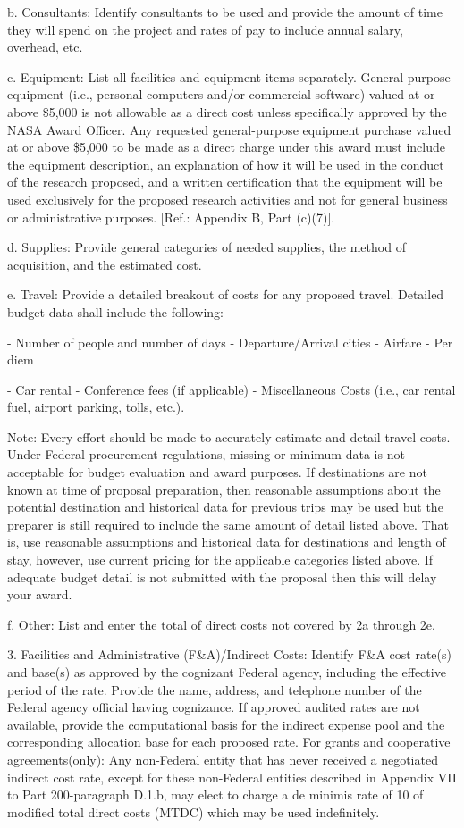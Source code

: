 \documentclass[12pt]{article}
\begin{document}
b. Consultants: Identify consultants to be used and provide the amount
of time they will spend on the project and rates of pay to include
annual salary, overhead, etc.

c. Equipment: List all facilities and equipment items
separately. General-purpose equipment (i.e., personal computers and/or
commercial software) valued at or above \$5,000 is not allowable as a
direct cost unless specifically approved by the NASA Award
Officer. Any requested general-purpose equipment purchase valued at or
above \$5,000 to be made as a direct charge under this award must
include the equipment description, an explanation of how it will be
used in the conduct of the research proposed, and a written
certification that the equipment will be used exclusively for the
proposed research activities and not for general business or
administrative purposes. [Ref.: Appendix B, Part (c)(7)].

d. Supplies: Provide general categories of needed supplies, the method
of acquisition, and the estimated cost.

e. Travel: Provide a detailed breakout of costs for any proposed
travel. Detailed budget data shall include the following:

- Number of people and number of days - Departure/Arrival cities -
  Airfare - Per diem

- Car rental - Conference fees (if applicable) - Miscellaneous Costs
  (i.e., car rental fuel, airport parking, tolls, etc.).

Note: Every effort should be made to accurately estimate and detail
travel costs. Under Federal procurement regulations, missing or
minimum data is not acceptable for budget evaluation and award
purposes. If destinations are not known at time of proposal
preparation, then reasonable assumptions about the potential
destination and historical data for previous trips may be used but the
preparer is still required to include the same amount of detail listed
above. That is, use reasonable assumptions and historical data for
destinations and length of stay, however, use current pricing for the
applicable categories listed above. If adequate budget detail is not
submitted with the proposal then this will delay your award.

f. Other: List and enter the total of direct costs not covered by 2a
through 2e.



3. Facilities and Administrative (F\&A)/Indirect Costs: Identify F\&A
   cost rate(s) and base(s) as approved by the cognizant Federal
   agency, including the effective period of the rate. Provide the
   name, address, and telephone number of the Federal agency official
   having cognizance. If approved audited rates are not available,
   provide the computational basis for the indirect expense pool and
   the corresponding allocation base for each proposed rate. For
   grants and cooperative agreements(only): Any non-Federal entity
   that has never received a negotiated indirect cost rate, except for
   these non-Federal entities described in Appendix VII to Part
   200-paragraph D.1.b, may elect to charge a de minimis rate of 10%
   of modified total direct costs (MTDC) which may be used
   indefinitely.
\end{document}
